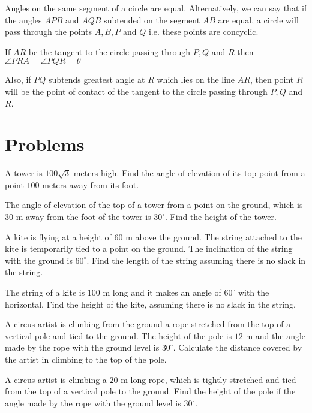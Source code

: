 Angles on the same segment of a circle are equal. Alternatively, we can say that if the angles
$APB$ and $AQB$ subtended on the segment $AB$ are equal, a circle will pass through the
points $A, B, P$ and $Q$ i.e. these points are concyclic.

\startplacefigure
  \externalfigure[27_5.pdf]
\stopplacefigure

If $AR$ be the tangent to the circle passing through $P, Q$ and $R$ then $\angle
PRA = \angle PQR = \theta$

Also, if $PQ$ subtends greatest angle at $R$ which lies on the line $AR$, then point
$R$ will be the point of contact of the tangent to the circle passing through $P, Q$ and
$R$.


\section{Problems}
\startitemize[n, 1*broad]
\item A tower is $100\sqrt{3}$ meters high. Find the angle of elevation of its top point from a point $100$ meters away
  from its foot.

\item The angle of elevation of the top of a tower from a point on the ground, which is $30$ m away from the foot of the tower
  is $30^\circ$. Find the height of the tower.

\item A kite is flying at a height of $60$ m above the ground. The string attached to the kite is temporarily tied to a point on
  the ground. The inclination of the string with the ground is $60^\circ$. Find the length of the string assuming there is
  no slack in the string.

\item The string of a kite is $100$ m long and it makes an angle of $60^\circ$ with the horizontal. Find the height of the
  kite, assuming there is no slack in the string.

\item A circus artist is climbing from the ground a rope stretched from the top of a vertical pole and tied to the ground. The height
  of the pole is $12$ m and the angle made by the rope with the ground level is $30^\circ$. Calculate the distance
  covered by the artist in climbing to the top of the pole.

\item A circus artist is climbing a $20$ m long rope, which is tightly stretched and tied from the top of a vertical pole to the
  ground. Find the height of the pole if the angle made by the rope with the ground level is $30^\circ$.

